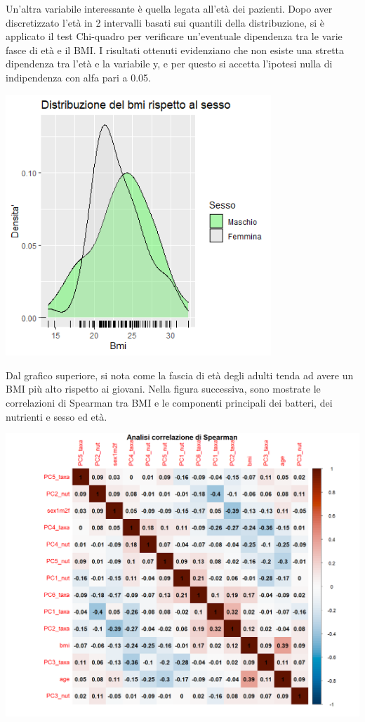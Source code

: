 Un’altra variabile interessante è quella legata all’età dei pazienti. Dopo aver discretizzato l’età in 2 intervalli basati sui quantili della distribuzione, si è applicato il test Chi-quadro per verificare un'eventuale dipendenza tra le varie fasce di età e il BMI. I risultati ottenuti evidenziano che non esiste una stretta dipendenza tra l’età e la variabile y, e per questo si accetta l’ipotesi nulla di indipendenza con alfa pari a 0.05.
\begin{Figure}
    \centering
    \includegraphics[width=10cm,keepaspectratio]{images/distribuzione_sesso_bmi.png}
  \end{Figure}

Dal grafico superiore, si nota come la fascia di età degli adulti tenda ad avere un BMI più alto rispetto ai giovani. Nella figura successiva, sono mostrate le correlazioni di Spearman tra BMI e le componenti principali dei batteri, dei nutrienti e sesso ed età. 
\begin{Figure}
    \centering
    \includegraphics[width=16cm,keepaspectratio]{images/corr_plot_regressori.png}
  \end{Figure}


